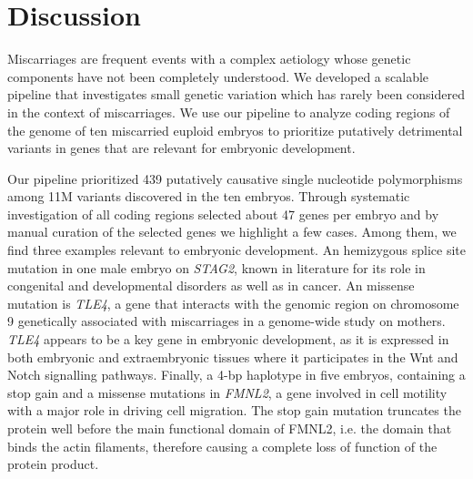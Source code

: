 \section*{Discussion}


Miscarriages are frequent events with a complex aetiology whose genetic components have not been completely understood. We developed a scalable pipeline that investigates small genetic variation which has rarely been considered in the context of miscarriages. We use our pipeline to analyze coding regions of the genome of ten miscarried euploid embryos to prioritize putatively detrimental variants in genes that are relevant for embryonic development. 

Our pipeline prioritized 439 putatively causative single nucleotide polymorphisms among 11M variants discovered in the ten embryos. Through systematic investigation of all coding regions \gp selected about 47 genes per embryo and by manual curation of the selected genes we highlight a few cases. Among them, we find three examples relevant to embryonic development. An hemizygous splice site mutation in one male embryo on \textit{STAG2}, known in literature for its role in congenital and developmental disorders as well as in cancer. An missense mutation is \textit{TLE4}, a gene that interacts with the genomic region on chromosome 9 genetically associated with miscarriages in a genome-wide study on mothers. \textit{TLE4} appears to be a key gene in embryonic development, as it is expressed in both embryonic and extraembryonic tissues where it participates in the Wnt and Notch signalling pathways. Finally, a 4-bp haplotype in five embryos, containing a stop gain and a missense mutations in \textit{FMNL2}, a gene involved in cell motility with a major role in driving cell migration. The stop gain mutation truncates the protein well before the main functional domain of FMNL2, i.e. the domain that binds the actin filaments, therefore causing a complete loss of function  of the protein product.    

